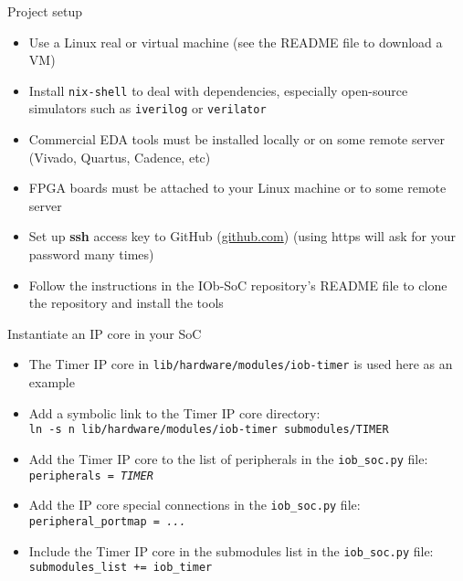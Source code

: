 \documentclass [xcolor=svgnames, t] {beamer}
\begin{document}
\begin{frame}{Project setup}
\begin{center}
  \begin{itemize}
  \item Use a Linux real or virtual machine (see the README file to download a VM)
    \item Install {\tt nix-shell} to deal with dependencies, especially open-source simulators such as {\tt iverilog} or {\tt verilator} 
    \item Commercial EDA tools must be installed locally or on some remote server (Vivado, Quartus, Cadence, etc) 
    \item FPGA boards must be attached to your Linux machine or to some remote server
    \item Set up {\bf ssh} access key to GitHub (\url{github.com}) (using https will ask for your password many times)
    \item Follow the instructions in the IOb-SoC repository's README file to clone the repository and install the tools
  \end{itemize}
\end{center}
\end{frame}


\begin{frame}{Instantiate an IP core in your SoC}
  \begin{itemize}
  \item The Timer IP core in {\tt lib/hardware/modules/iob-timer} is used here as an example
  \item Add a symbolic link to the Timer IP core directory:\\
    {\tt \tiny ln -s n {\tt lib/hardware/modules/iob-timer submodules/TIMER}}
  \item Add the Timer IP core to the list of peripherals in the {\tt iob\_soc.py} file:\\
    {\tt peripherals =  {\em TIMER}}
  \item Add the IP core special connections in the {\tt iob\_soc.py} file:\\
    {\tt peripheral\_portmap =  {\em ...}}
  \item Include the Timer IP core  in the submodules list in the  {\tt iob\_soc.py} file:\\
    {\tt submodules\_list += iob\_timer}
  \end{itemize}
\end{frame}
\end{document}
